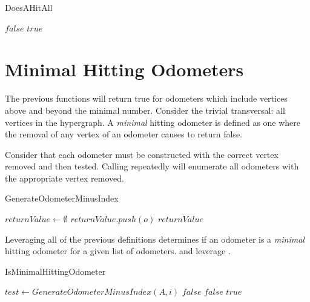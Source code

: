 \begin{algorithm}[H]
    \centering
	\caption{DoesAHitAll}\label{DoesAHitAll}
	\begin{algorithmic}[1]
		\State \Return $false$
		\EndIf
		\EndFor
		\State \Return $true$
		\EndFunction
	\end{algorithmic}
\end{algorithm}

\section{Minimal Hitting Odometers}

The previous functions will return true for odometers which include vertices above and beyond the minimal number. Consider the trivial transversal: all vertices in the hypergraph.  A \emph{minimal} hitting odometer is defined as one where the removal of any vertex of an odometer causes  to return false. 

Consider that each odometer must be constructed with the correct vertex removed and then tested. Calling  repeatedly will enumerate all odometers with the appropriate vertex removed.
\begin{algorithm}[H]
    \centering
	\caption{GenerateOdometerMinusIndex}\label{GenerateOdometerMinusIndex}
	\begin{algorithmic}[1]
		\State $returnValue \gets \emptyset $ 
		\State $returnValue.push(o)$
		\EndIf
		\EndFor
        \State \Return $returnValue$ 
		\EndFunction
	\end{algorithmic}
\end{algorithm}

 Leveraging all of the previous definitions  determines if an odometer is a \textit{minimal} hitting odometer for a given list of odometers.  and  leverage . 

\begin{algorithm}[H]
    \centering
	\caption{IsMinimalHittingOdometer}\label{IsMinimalHittingOdometer}
	\begin{algorithmic}[1]
		\State $test \gets GenerateOdometerMinusIndex(A,i)$
		\State \Return $false$
		\EndIf
		\EndFor
        \Else
		\State \Return $false$
		\EndIf
		\State \Return $true$
		\EndFunction
	\end{algorithmic}
\end{algorithm}


